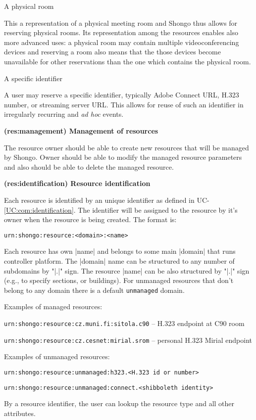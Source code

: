 \documentclass[a4paper]{report}
\makeatletter
\newcommand{\ApiValue}[1]{\verb|#1|}
\newcounter{UCcounter}
\newenvironment{UseCases}%
	{\begin{list}{\textbf{UC-\arabic{UCcounter}}}{\@nmbrlisttrue\def\@listctr{UCcounter}}}%
	{\end{list}}
\newcommand{\UClabel}[1]{\label{UC:#1}}
\newcommand{\UCref}[1]{UC-\ref{UC:#1}}
\newcommand{\UseCase}[2]{\item\UClabel{#2} \textbf{(#2) #1}\\ \nopagebreak}
\makeatother
\begin{document}
\begin{UseCases}
\begin{compactdesc}
\item[A physical room]

This a representation of a physical meeting room and Shongo thus allows for
reserving physical rooms. Its representation among the resources enables also
more advanced uses: a physical room may contain multiple videoconferencing
devices and reserving a room also means that the those devices become
unavailable for other reservations than the one which contains the physical
room.

\item[A specific identifier]

A user may reserve a specific identifier, typically Adobe Connect URL, H.323
number, or streaming server URL. This allows for reuse of such an identifier in
irregularly recurring and \emph{ad hoc} events.

\end{compactdesc}


\UseCase{Management of resources}{res:management}

The resource owner should be able to create new resources that will be managed by Shongo. Owner should be able to modify the managed resource parameters and also should be able to delete the managed resource.

\UseCase{Resource identification}{res:identification}

Each resource is identified by an unique identifier as defined in \UCref{com:identification}. The identifier will be
assigned to the resource by it's owner when the resource is being created. The format is:
\begin{verbatim}
urn:shongo:resource:<domain>:<name>
\end{verbatim}
Each resource has own |name| and belongs to some main |domain| that runs controller platform. The |domain| name can be structured to any number of subdomains by "|.|" sign. The resource |name| can be also structured by "|.|" sign (e.g., to specify sections, or buildings). For unmanaged resources that don’t belong to any domain there is a default \ApiValue{unmanaged} domain.

Examples of managed resources:
\begin{compactitem}
\item \ApiValue{urn:shongo:resource:cz.muni.fi:sitola.c90} -- H.323 endpoint at C90 room
\item \ApiValue{urn:shongo:resource:cz.cesnet:mirial.srom} -- personal H.323 Mirial endpoint
\end{compactitem}

Examples of unmanaged resources:
\begin{compactitem}
\item \ApiValue{urn:shongo:resource:unmanaged:h323.<H.323 id or number>}
\item \ApiValue{urn:shongo:resource:unmanaged:connect.<shibboleth identity>}
\end{compactitem}

By a resource identifier, the user can lookup the resource type and all other attributes.

\end{UseCases}
\end{document}
